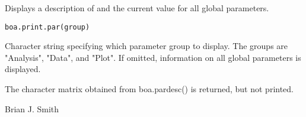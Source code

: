 \begin{Description}\relax
Displays a description of and the current value for all global parameters.
\end{Description}
\begin{Usage}
\begin{verbatim}
boa.print.par(group)
\end{verbatim}
\end{Usage}
\begin{Arguments}
\begin{ldescription}
\item[\code{group}] Character string specifying which parameter group to display.
The groups are "Analysis", "Data", and "Plot". If omitted, information on 
all global parameters is displayed.
\end{ldescription}
\end{Arguments}
\begin{Value}
The character matrix obtained from boa.pardesc() is returned, but not printed.
\end{Value}
\begin{Author}\relax
Brian J. Smith
\end{Author}
\begin{SeeAlso}\relax
{}
\end{SeeAlso}

